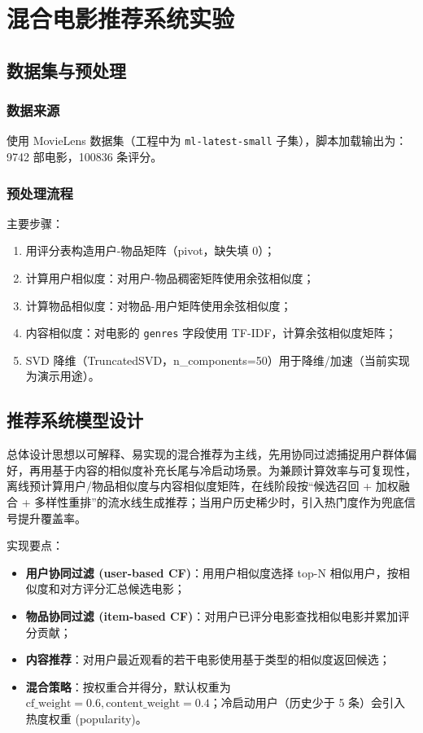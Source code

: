 \chapter{混合电影推荐系统实验}

\section{数据集与预处理}
\subsection{数据来源}
使用 MovieLens 数据集（工程中为 \texttt{ml-latest-small} 子集），脚本加载输出为：9742 部电影，100836 条评分。

\subsection{预处理流程}
主要步骤：
\begin{enumerate}
  \item 用评分表构造用户-物品矩阵（pivot，缺失填 0）；
  \item 计算用户相似度：对用户-物品稠密矩阵使用余弦相似度；
  \item 计算物品相似度：对物品-用户矩阵使用余弦相似度；
  \item 内容相似度：对电影的 \texttt{genres} 字段使用 TF-IDF，计算余弦相似度矩阵；
  \item SVD 降维（TruncatedSVD，n\_components=50）用于降维/加速（当前实现为演示用途）。
\end{enumerate}

\section{推荐系统模型设计}
总体设计思想以可解释、易实现的混合推荐为主线，先用协同过滤捕捉用户群体偏好，再用基于内容的相似度补充长尾与冷启动场景。为兼顾计算效率与可复现性，离线预计算用户/物品相似度与内容相似度矩阵，在线阶段按“候选召回 + 加权融合 + 多样性重排”的流水线生成推荐；当用户历史稀少时，引入热门度作为兜底信号提升覆盖率。

实现要点：
\begin{itemize}
  \item \textbf{用户协同过滤 (user-based CF)}：用用户相似度选择 top-N 相似用户，按相似度和对方评分汇总候选电影；
  \item \textbf{物品协同过滤 (item-based CF)}：对用户已评分电影查找相似电影并累加评分贡献；
  \item \textbf{内容推荐}：对用户最近观看的若干电影使用基于类型的相似度返回候选；
  \item \textbf{混合策略}：按权重合并得分，默认权重为 $\text{cf\_weight}=0.6, \text{content\_weight}=0.4$；冷启动用户（历史少于 5 条）会引入热度权重 (popularity)。
\end{itemize}

